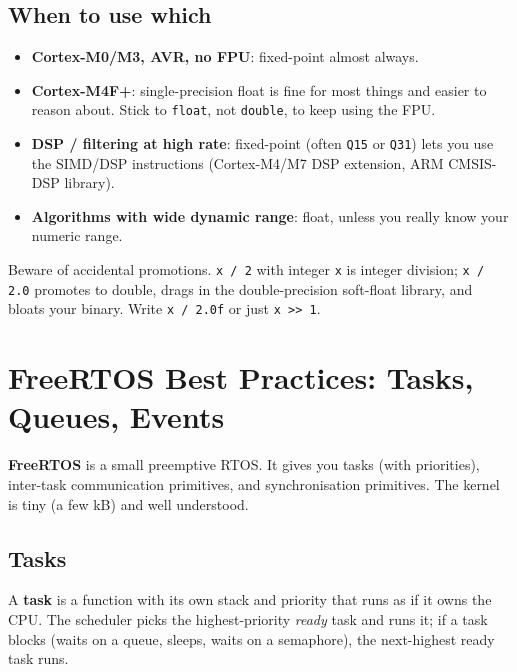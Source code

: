 \documentclass[11pt,a4paper]{article}
\begin{document}
\subsection{When to use which}

\begin{itemize}[leftmargin=*]
    \item \textbf{Cortex-M0/M3, AVR, no FPU}: fixed-point almost always.
    \item \textbf{Cortex-M4F+}: single-precision float is fine for most
    things and easier to reason about. Stick to \texttt{float}, not
    \texttt{double}, to keep using the FPU.
    \item \textbf{DSP / filtering at high rate}: fixed-point (often
    \texttt{Q15} or \texttt{Q31}) lets you use the SIMD/DSP instructions
    (Cortex-M4/M7 DSP extension, ARM CMSIS-DSP library).
    \item \textbf{Algorithms with wide dynamic range}: float, unless you
    really know your numeric range.
\end{itemize}

\begin{warning}
Beware of accidental promotions. \texttt{x / 2} with integer \texttt{x}
is integer division; \texttt{x / 2.0} promotes to double, drags in the
double-precision soft-float library, and bloats your binary. Write
\texttt{x / 2.0f} or just \texttt{x >> 1}.
\end{warning}

\section{FreeRTOS Best Practices: Tasks, Queues, Events}

\textbf{FreeRTOS} is a small preemptive RTOS. It gives you tasks (with
priorities), inter-task communication primitives, and synchronisation
primitives. The kernel is tiny (a few kB) and well understood.

\subsection{Tasks}

A \textbf{task} is a function with its own stack and priority that runs as
if it owns the CPU. The scheduler picks the highest-priority \emph{ready}
task and runs it; if a task blocks (waits on a queue, sleeps, waits on a
semaphore), the next-highest ready task runs.
\end{document}
